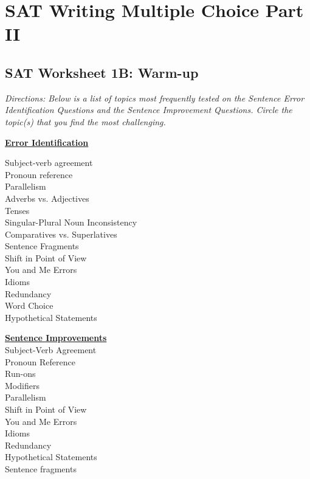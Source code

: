\chapter[Multiple Choice PartII]{SAT Writing Multiple Choice Part II}
\section{SAT Worksheet 1B: Warm-up}
\textit{Directions: Below is a list of topics most frequently tested on the Sentence Error Identification Questions and the Sentence Improvement Questions. Circle the topic(s) that you find the most challenging.} 

\bigskip
\begin{center}
\begin{multicols}{2}
\textbf{\underline{Error Identification}}

Subject-verb agreement\\
Pronoun reference\\
Parallelism\\
Adverbs vs. Adjectives\\
Tenses\\
Singular-Plural Noun Inconsistency\\
Comparatives vs. Superlatives\\
Sentence Fragments\\
Shift in Point of View\\
You and Me Errors\\
Idioms\\
Redundancy\\
Word Choice\\
Hypothetical Statements

\columnbreak
\textbf{\underline{Sentence Improvements}}\\
Subject-Verb Agreement\\
Pronoun Reference\\
Run-ons\\
Modifiers\\
Parallelism\\
Shift in Point of View\\
You and Me Errors\\
Idioms\\
Redundancy\\
Hypothetical Statements\\
Sentence fragments\\
\end{multicols}
\end{center}

